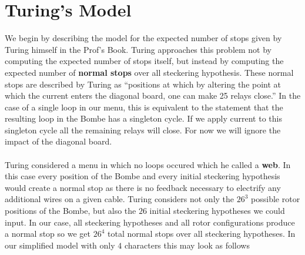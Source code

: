 \section{Turing's Model}
We begin by describing the model for the expected number of stops given by Turing himself in the Prof's Book. Turing approaches this problem not by computing the expected number of stops itself, but instead by computing the expected number of {\bf{normal stops}} over all steckering hypothesis. These normal stops are described by Turing as ``positions at which by altering the point at which the current enters the diagonal board, one can make 25 relays close.'' In the case of a single loop in our menu, this is equivalent to the statement that the resulting loop in the Bombe has a singleton cycle. If we apply current to this singleton cycle all the remaining relays will close. For now we will ignore the impact of the diagonal board.
\\\\Turing considered a menu in which no loops occured which he called a {\bf{web}}. In this case every position of the Bombe and every initial steckering hypothesis would create a normal stop as there is no feedback necessary to electrify any additional wires on a given cable. Turing considers not only the $26^3$ possible rotor positions of the Bombe, but also the $26$ initial steckering hypotheses we could input. In our case, all steckering hypotheses and all rotor configurations produce a normal stop so we get $26^4$ total normal stops over all steckering hypotheses. In our simplified model with only $4$ characters this may look as follows
